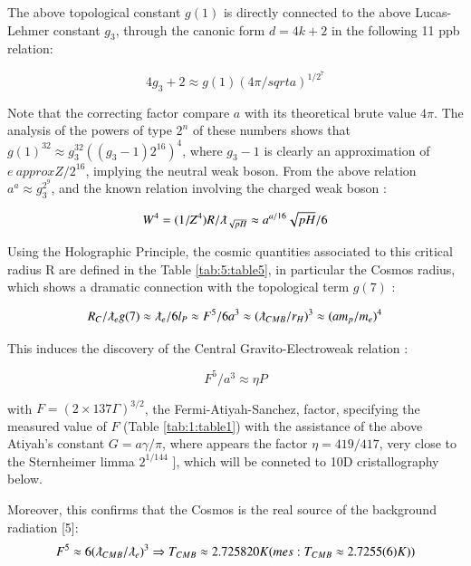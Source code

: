\documentclass[a4paper,9pt]{article}
\begin{document}
The above topological constant $g(1)$ is directly connected to the above Lucas-Lehmer constant $g_3$, through the canonic form $d = 4k+2$ in the following 11 ppb relation:

\begin{equation}
4g_3 +2  \approx g(1) (4\pi/sqrt a)^{1/2^7} 
\end{equation}

Note that the correcting factor compare $a$ with its theoretical brute value $4\pi$. The analysis of the powers of type $2^n$ of these numbers shows that $g(1)^{32} \approx g_3^{32}((g_3 - 1) 2^{16})^4$, where $g_3 - 1$ is clearly an approximation of $e \ approx Z/2^{16}$, implying the neutral weak boson. From the above relation $ a^a \approx g_3^{2^9}$, and the known relation involving the charged weak boson \cite{Sanchez}:

\begin{equation}
W^4 = (1/Z^4)R/\lambdabar_{\sqrt{pH}} \approx a^{a/16} \sqrt{pH}/6  
\end{equation}

Using the Holographic Principle, the cosmic quantities associated to this critical radius R are defined in the Table \ref{tab:5:table5}, in particular the Cosmos radius, which shows a dramatic connection with the topological term $g(7)$ :

\begin{equation}
R_{C}/\lambdabar_{e} g(7) \approx  \lambdabar_{e}/6l_P \approx F^5/6a^3 \approx (\lambdabar_{CMB}/r_H)^3 \approx  (am_p/m_e)^4  
\end{equation}

This induces the discovery of the Central Gravito-Electroweak relation :

\begin{equation*}
F^5/a^3 \approx \eta P    
\end{equation*}{}
  

with  $F = (2\times 137 \Gamma)^{3/2}$, the Fermi-Atiyah-Sanchez, factor, specifying the measured value of  $F$ (Table \ref{tab:1:table1}) with the assistance of the above Atiyah's constant $G = a \gamma/ \pi$, where appears the factor $\eta = 419/417$, very close to the Sternheimer limma $2^{1/144}$ \cite{Sternheimer}], which will be conneted to 10D cristallography below.


Moreover, this confirms that the Cosmos is the real source of the background radiation [5]:
\begin{equation}
F^5  \approx 6(\lambdabar_{CMB}/\lambdabar_{e})^3 \Rightarrow  T_{CMB}  \approx  2.725820 K  (mes : T_{CMB}  \approx  2.7255(6) K)) 
\end{equation}
\end{document}

